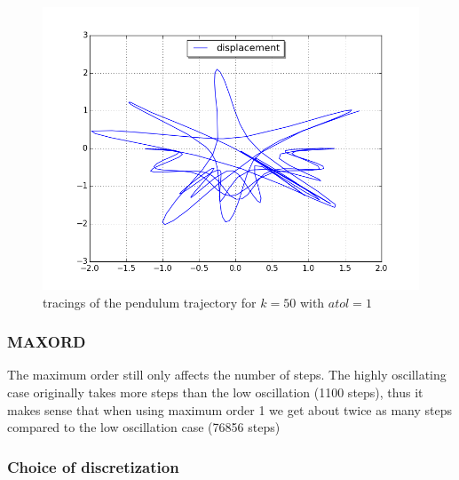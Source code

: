\documentclass[a4paper,11pt]{article}
\theoremstyle{mytheor}
\begin{document}
\begin{figure}[!h]
\centering
\includegraphics[scale=0.5]{task1_k50_utdrag12_rtol01.png}
\caption{tracings of the pendulum trajectory for $k = 50$ with $atol = 1$}
\label{3k10at01}
\end{figure}

\subsubsection*{MAXORD}
The maximum order still only affects the number of steps. The highly oscillating case originally takes more steps than the low oscillation (1100 steps), thus it makes sense that when using maximum order 1 we get about twice as many steps compared to the low oscillation case (76856 steps)

\subsubsection*{Choice of discretization}
\end{document}
